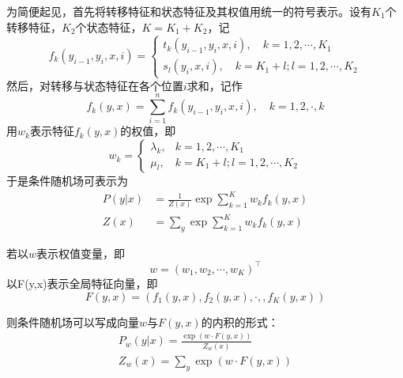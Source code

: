 \documentclass[a4paper,UTF8,no-math]{ctexart}
\begin{document}
	    为简便起见，首先将转移特征和状态特征及其权值用统一的符号表示。设有$ K_{1} $个转移特征，$ K_{2} $个状态特征，$ K=K_{1}+K_{2} $，记\begin{equation}
	    f_{k}\left(y_{i-1}, y_{i}, x, i\right)=\left\{\begin{array}{l}{t_{k}\left(y_{i-1}, y_{i}, x, i\right), \quad k=1,2, \cdots, K_{1}} \\ {s_{l}\left(y_{i}, x, i\right), \quad k=K_{1}+l ; l=1,2, \cdots, K_{2}}\end{array}\right.
	    \end{equation}然后，对转移与状态特征在各个位置$ i $求和，记作\begin{equation}
	    	f_{k}(y,x)=\sum_{i=1}^{n} f_{k}(y_{i-1},y_{i},x,i),\quad k=1,2,\cdot,k
	    \end{equation}用$ w_{k} $表示特征$ f_{k}(y,x) $的权值，即\begin{equation}
	    w_{k}=\begin{cases}
	    \lambda_{k}, & k=1,2,\cdots,K_{1} \\
	    \mu_{l}, & k=K_{1}+l;l=1,2,\cdots,K_{2}
	    \end{cases}
	    \end{equation}于是条件随机场可表示为\begin{equation}
	    \begin{aligned} P(y | x) &=\frac{1}{Z(x)} \exp \sum_{k=1}^{K} w_{k} f_{k}(y, x) \\ Z(x) &=\sum_{y} \exp \sum_{k=1}^{K} w_{k} f_{k}(y, x) \end{aligned}
	    \end{equation}
	    
	    若以$ w $表示权值变量，即\begin{equation}
	    	w = (w_{1},w_{2},\cdots,w_{K})^{\top}
	    \end{equation}以F(y,x)表示全局特征向量，即\begin{equation}
	    	F(y,x) = \left(f_{1}\left(y,x\right),f_{2}\left(y,x\right),\cdot,,f_{K}\left(y,x\right)\right)
	    \end{equation}
	   
	    则条件随机场可以写成向量$ w $与$ F(y,x) $的内积的形式：\begin{equation}
	    	\begin{aligned}
	    	P_{w}(y|x) = \frac{\exp{\left(w\cdot F\left(y,x\right)\right)}}{Z_{w}(x)}\\
	    	Z_{w}(x) = \sum_{y}\exp{\left(w\cdot F\left(y,x\right)\right)}
	    	\end{aligned}
	    \end{equation}
	    
\end{document}
